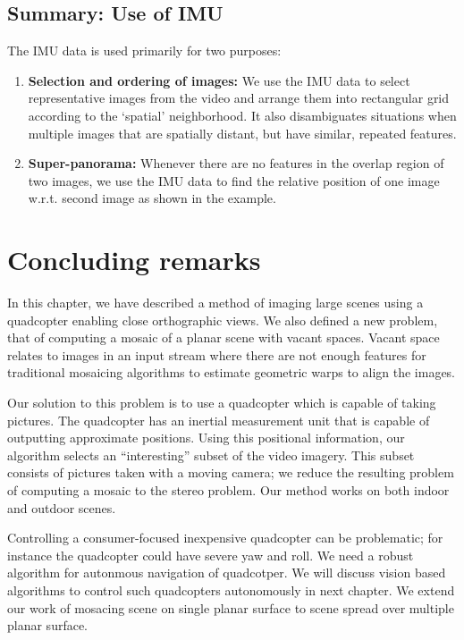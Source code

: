 \subsection{Summary: Use of IMU}
The IMU data is used primarily for two purposes:
\begin{enumerate}
\item \textbf{Selection and ordering of images:} We use the IMU data
  to select representative images from the video and arrange them into
  rectangular grid according to the `spatial' neighborhood. It also
  disambiguates situations when multiple images that are spatially
  distant, but have similar, repeated features.

\item \textbf{Super-panorama:} Whenever there are no features in
  the overlap region of two images, we use the IMU data to find the
  relative position of one image w.r.t. second image as shown in the
  example. 
\end{enumerate}


\section{Concluding remarks}

In this chapter, we have described a method of imaging large scenes
using a quadcopter enabling close orthographic views. We also defined
a new problem, that of computing a mosaic of a planar scene with
vacant spaces.  Vacant space relates to images in an input stream
where there are not enough features for traditional mosaicing
algorithms to estimate geometric warps to align the images.

Our solution to this problem is to use a quadcopter which
is capable of taking pictures.  The quadcopter has an inertial
measurement unit that is capable of outputting approximate
positions. Using this positional information, our algorithm selects an
``interesting'' subset of the video imagery.  This subset consists of
pictures taken with a moving camera; we reduce the resulting
problem of computing a mosaic to the stereo problem.  Our
method works on both indoor and outdoor scenes.

Controlling a consumer-focused inexpensive quadcopter can be
problematic; for instance the quadcopter could have severe yaw and
roll.  We need a robust algorithm for autonmous navigation of quadcotper.
We will discuss vision based algorithms to control such quadcopters autonomously
in next chapter. We extend our work of mosacing scene on single planar
surface to scene spread over multiple planar surface.